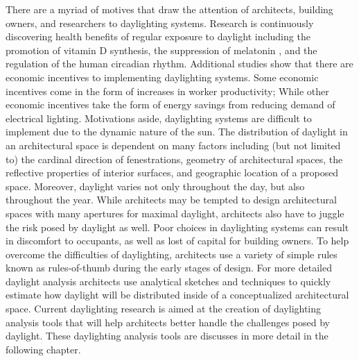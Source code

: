 There are a myriad of motives that draw the attention of architects, building owners, and researchers to daylighting systems.  Research is continuously discovering health benefits of regular exposure to daylight including the promotion of vitamin D synthesis, the suppression of melatonin , and the regulation of the human circadian rhythm.  Additional studies show  that there are economic incentives to implementing daylighting systems.  Some economic incentives come in the form of increases in worker productivity; While other economic incentives take the form of energy savings from reducing demand of electrical lighting.  Motivations aside, daylighting systems are difficult to implement due to the dynamic nature of the sun.  The distribution of daylight in an architectural space is dependent on many factors including (but not limited to) the cardinal direction of fenestrations, geometry of architectural spaces, the reflective properties of interior surfaces, and geographic location of a proposed space.  Moreover, daylight varies not only throughout the day, but also throughout the year.  While architects may be tempted to design architectural spaces with many apertures for maximal daylight, architects also have to juggle the risk posed by daylight as well.  Poor choices in daylighting systems can result in discomfort to occupants, as well as lost of capital for building owners.  To help overcome the difficulties of daylighting, architects use a variety of simple rules known as rules-of-thumb during the early stages of design.  For more detailed daylight analysis architects use analytical sketches and techniques to quickly estimate how daylight will be distributed inside of a conceptualized architectural space.  Current daylighting research is aimed at the creation of daylighting analysis tools that will help architects better handle the challenges posed by daylight.  These daylighting analysis tools are discusses in more detail in the following chapter.\\
